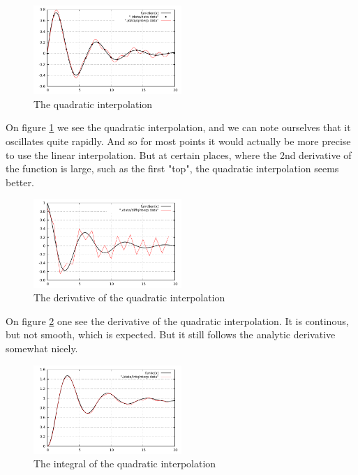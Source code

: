 \documentclass[a4paper,reprint,nofootinbib,aps,pra]{revtex4-1}
\begin{document}
\begin{figure}[H]
    \centering
    \includegraphics[width=0.5\textwidth]{./tex/qinterp.pdf}
    \caption{The quadratic interpolation}
    \label{fig:qinterp}
\end{figure} 

On figure \ref{fig:qinterp} we see the quadratic interpolation, and we can note ourselves that it oscillates quite rapidly. And so for most points it would actually be more precise to use the linear interpolation. But at certain places, where the 2nd derivative of the function is large, such as the first "top", the quadratic interpolation seems better.


\begin{figure}[H]
    \centering
    \includegraphics[width=0.5\textwidth]{./tex/diffqinterp.pdf}
    \caption{The derivative of the quadratic interpolation}
    \label{fig:diffqinterp}
\end{figure} 


On figure \ref{fig:diffqinterp} one see the derivative of the quadratic interpolation. It is continous, but not smooth, which is expected.
But it still follows the analytic derivative somewhat nicely.

\begin{figure}[H]
    \centering
    \includegraphics[width=0.5\textwidth]{./tex/intqinterp.pdf}
    \caption{The integral of the quadratic interpolation}
    \label{fig:intqinterp}
\end{figure} 
\end{document}
